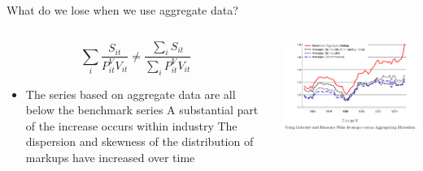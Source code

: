 \documentclass{beamer}
\begin{document}
  \begin{frame}{What do we lose when we use aggregate data?}
    \begin{columns}
\begin{column}{0.5\textwidth}
  \[\sum_i \frac{S_{it}}{P_{it}^V V_{it}} \ne \frac{\sum_i S_{it}}{\sum_i P^V_{it} V_{it}}\]
  \begin{itemize}
  \item The series based on aggregate data are all below the benchmark series
    \vitem A substantial part of the increase occurs within industry
    \vitem The dispersion and skewness of the distribution of markups have increased over time
  \end{itemize}
\end{column}
\begin{column}{0.65\textwidth}  %
    \begin{center}
     \includegraphics[width=\textwidth, keepaspectratio=true]{fig5.png}
     \end{center}
\end{column}
\end{columns}
  \end{frame}
\end{document}
